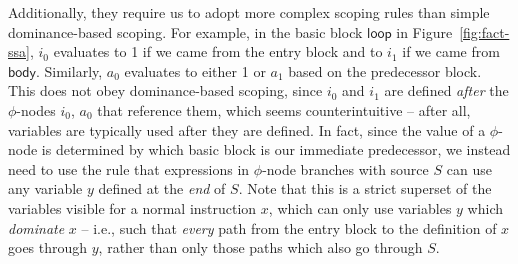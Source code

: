 \documentclass[acmsmall,screen,review]{acmart}
\newcommand{\ms}[1]{\ensuremath{\mathsf{#1}}}
\begin{document}
Additionally, they require us to adopt more complex scoping rules than simple dominance-based
scoping. For example, in the basic block \ms{loop} in Figure~\ref{fig:fact-ssa}, $i_0$ evaluates to
1 if we came from the entry block and to $i_1$ if we came from \ms{body}. Similarly, $a_0$ evaluates
to either 1 or $a_1$ based on the predecessor block. This does not obey dominance-based scoping,
since $i_0$ and $i_1$ are defined \emph{after} the $\phi$-nodes $i_0$, $a_0$ that reference them,
which seems counterintuitive -- after all, variables are typically used after they are defined. In
fact, since the value of a $\phi$-node is determined by which basic block is our immediate
predecessor, we instead need to use the rule that expressions in $\phi$-node branches with source
$S$ can use any variable $y$ defined at the \emph{end} of $S$. Note that this is a strict superset
of the variables visible for a normal instruction $x$, which can only use variables $y$ which
\emph{dominate} $x$ -- i.e., such that \emph{every} path from the entry block to the definition of
$x$ goes through $y$, rather than only those paths which also go through $S$.
\end{document}
